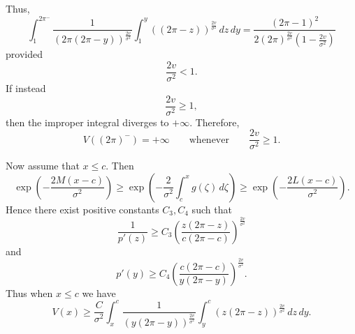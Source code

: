 \documentclass[11pt]{article}
\newcommand{\1}{\mathbbm{1}}
\theoremstyle{plain}
\theoremstyle{definition}
\theoremstyle{remark}
\begin{document}
Thus,
\[
\int_1^{2\pi^-} \frac{1}{\left(2\pi(2\pi-y)\right)^{\frac{2v}{\sigma^2}}}
\int_1^y \left((2\pi-z)\right)^{\frac{2v}{\sigma^2}}\,dz\,dy
=
\frac{(2\pi-1)^2}{2(2\pi)^{\frac{2v}{\sigma^2}}\left(1-\frac{2v}{\sigma^2}\right)}
\]
provided
\[
\frac{2v}{\sigma^2}<1.
\]
If instead
\[
\frac{2v}{\sigma^2}\ge 1,
\]
then the improper integral diverges to $+\infty$. Therefore,
\[
V((2\pi)^-)=+\infty
\qquad\text{whenever}\qquad
\frac{2v}{\sigma^2}\ge 1.
\]

Now assume that $x\leq c$. Then
\[
 \exp\!\left(-\frac{2M(x-c)}{\sigma^2}\right)
 \geq
 \exp\!\left(-\frac{2}{\sigma^2}\int_c^x g(\zeta)\,d\zeta\right)
 \geq
 \exp\!\left(-\frac{2L(x-c)}{\sigma^2}\right).
\]
Hence there exist positive constants $C_3,C_4$ such that
\[
\frac{1}{p'(z)}
\geq
C_3 \left(\frac{z(2\pi-z)}{c(2\pi-c)}\right)^{\frac{2v}{\sigma^2}}
\]
and
\[
p'(y)\geq
C_4 \left(\frac{c(2\pi-c)}{y(2\pi-y)}\right)^{\frac{2v}{\sigma^2}}.
\]
Thus when $x\leq c$ we have
\[
V(x)\geq \frac{C}{\sigma^2} \int_x^c \frac{1}{\left(y(2\pi-y)\right)^{\frac{2v}{\sigma^2}}}\int_y^c \left(z(2\pi-z)\right)^{\frac{2v}{\sigma^2}}\,dz\,dy.
\]
\end{document}
